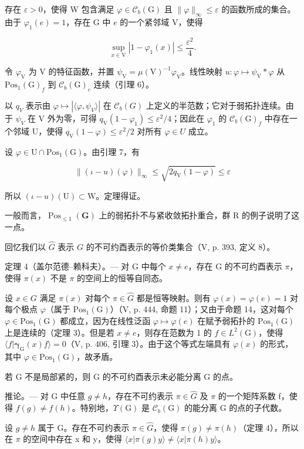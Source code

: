存在 \(\varepsilon > 0\)，使得 W 包含满足 \(\varphi \in \mathcal{C}_b(\mathrm{G})\) 且 \(\| \varphi \|_{\infty} \leqslant \varepsilon\) 的函数所成的集合。由于 \(\varphi_1(e) = 1\)，存在 G 中 \(e\) 的一个紧邻域 V，使得

\[
\sup _ {x \in \mathrm{V}} | 1 - \varphi_ {1} (x) | \leqslant \frac {\varepsilon^ {2}}{4}.
\]

令 \(\varphi_{\mathrm{V}}\) 为 V 的特征函数，并置 \(\psi_{\mathrm{V}} = \mu (\mathrm{V})^{-1}\varphi_{\mathrm{V}}\)。线性映射 \(u\colon \varphi \mapsto \psi_{\mathrm{V}}*\varphi\) 从 \(\mathrm{Pos}_1(\mathrm{G})_f\) 到 \(\mathcal{C}_b(\mathrm{G})_c\) 连续（引理 6）。

以 \(q_{V}\) 表示由 \(\varphi\mapsto|\langle\varphi,\psi_{V}\rangle|\) 在 \(\mathcal{C}_{b}(G)\) 上定义的半范数；它对于弱拓扑连续。由于 \(\psi_{V}\) 在 V 外为零，可得 \(q_{\mathrm{V}}(1-\varphi_{1})\leqslant\varepsilon^{2}/4\)；因此在 \(\varphi_{1}\) 的 \(\mathcal{C}_{b}(\mathrm{G})_{f}\) 中存在一个邻域 U，使得 \(q_{\mathrm{V}}(1-\varphi)\leqslant\varepsilon^{2}/2\) 对所有 \(\varphi\in U\) 成立。

设 \(\varphi\in\mathrm{U}\cap\mathrm{Pos}_{1}(\mathrm{G})\)。由引理 7，有

\[
\| (\iota - u) (\varphi) \| _ {\infty} \leqslant \sqrt {2 q _ {\mathrm{V}} (1 - \varphi)} \leqslant \varepsilon
\]

所以 \((\iota - u)(\mathrm{U}) \subset \mathrm{W}\)。定理得证。

一般而言，\(\operatorname{Pos}_{\leqslant1}(\mathbf{G})\) 上的弱拓扑不与紧收敛拓扑重合，群 R 的例子说明了这一点。

回忆我们以 \(\widehat{G}\) 表示 \(G\) 的不可约酉表示的等价类集合（V, p. 393, 定义 8）。

定理 4（盖尔范德--赖科夫）。--- 对 G 中每个 \(x \neq e\)，存在 G 的不可约酉表示 \(\pi\)，使得 \(\pi(x)\) 不是 \(\pi\) 的空间上的恒等自同态。

设 \(x \in G\) 满足 \(\pi(x)\) 对每个 \(\pi \in \widehat{G}\) 都是恒等映射。则有 \(\varphi(x) = \varphi(e) = 1\) 对每个极点 \(\varphi\)（属于 \(\mathrm{Pos}_{1}(\mathrm{G})\)）（V, p. 444, 命题 11）；又由于命题 14，这对每个 \(\varphi \in \mathrm{Pos}_{1}(\mathrm{G})\) 都成立，因为在线性泛函 \(\varphi \mapsto \varphi(e)\) 在赋予弱拓扑的 \(\mathrm{Pos}_{1}(\mathrm{G})\) 上是连续的（定理 3）。但是若 \(x \neq e\)，则存在范数为 1 的 \(f \in L^{2}(\mathrm{G})\)，使得 \(\langle f | \boldsymbol{\gamma}_{\mathrm{G}}(x)f \rangle = 0\)（V, p. 406, 引理 3）。由于这个等式左端具有 \(\varphi(x)\) 的形式，其中 \(\varphi \in \mathrm{Pos}_{1}(\mathrm{G})\)，故矛盾。

若 G 不是局部紧的，则 G 的不可约酉表示未必能分离 G 的点。

推论。--- 对 G 中任意 \(g \neq h\)，存在不可约表示 \(\pi \in \widehat{G}\) 及 \(\pi\) 的一个矩阵系数 f，使得 \(f(g) \neq f(h)\)。特别地，\(\Upsilon(\mathrm{G})\) 是 \(\mathcal{C}_{b}(\mathrm{G})\) 的能分离 G 的点的子代数。

设 \(g \neq h\) 属于 G。存在不可约表示 \(\pi \in \widehat{G}\)，使得 \(\pi(g) \neq \pi(h)\)（定理 4），所以在 \(\pi\) 的空间中存在 x 和 y，使得 \(\langle x | \pi(g)y \rangle \neq \langle x | \pi(h)y \rangle\)。

